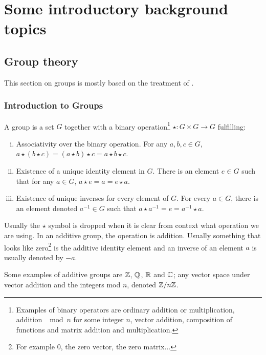 \clearpage{\thispagestyle{empty}}
\section{Some introductory background topics}

\subsection{Group theory}



This section on groups is mostly based on the treatment of \cite{DummitFoote}.

\subsubsection{Introduction to Groups}

\begin{definition}[Group]
	A group is a set $G$ together with a binary operation\footnote{Examples of binary operators are ordinary addition or multiplication, addition $\mod n$ for some integer $n$, vector addition, composition of functions and matrix addition and multiplication.} $\star: G \times G \rightarrow G$ fulfilling:
	\begin{enumerate}[i)]
		\item Associativity over the binary operation. For any $a,b,c \in G$, $a \star (b \star c) = (a \star b) \star c = a \star b \star c$.
		\item Existence of a unique identity element in $G$. There is an element $e \in G$ such that for any $a \in G$, $a \star e = a = e \star a$.
		\item Existence of unique inverses for every element of $G$. For every $a \in G$, there is an element denoted $a^{-1} \in G$ such that $a \star a^{-1} = e = a^{-1} \star a$.
	\end{enumerate}
\end{definition}

Usually the $\star$ symbol is dropped when it is clear from context what operation we are using. In an additive group, the operation is addition. Usually something that looks like zero\footnote{For example 0, the zero vector, the zero matrix...} is the additive identity element and an inverse of an element $a$ is usually denoted by $-a$.

\begin{example}
	Some examples of additive groups are $\mathbb{Z}$, $\mathbb{Q}$, $\mathbb{R}$ and $\mathbb{C}$; any vector space under vector addition and the integers mod $n$, denoted $\mathbb{Z} / n \mathbb{Z}$.
\end{example}

